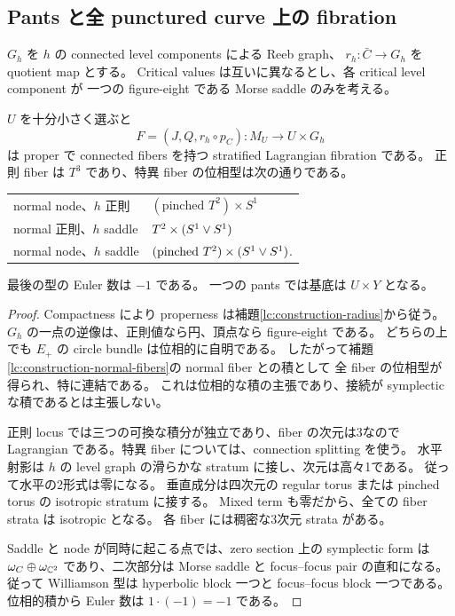 \subsection{Pants と全 punctured curve 上の fibration}

$G_h$ を $h$ の connected level components による Reeb graph、
$r_h:\bar C\to G_h$ を quotient map とする。
Critical values は互いに異なるとし、各 critical level component が
一つの figure-eight である Morse saddle のみを考える。

\begin{theorem}\label{lc:construction-block}
$U$ を十分小さく選ぶと
\[
 F=(J,Q,r_h\circ p_C):M_U\longrightarrow U\times G_h
\]
は proper で connected fibers を持つ stratified Lagrangian fibration である。
正則 fiber は $T^3$ であり、特異 fiber の位相型は次の通りである。
\begin{center}
\begin{tabular}{ll}
normal node、$h$ 正則 & $(\text{pinched }T^2)\times S^1$ \\
normal 正則、$h$ saddle & $T^2\times(S^1\vee S^1)$ \\
normal node、$h$ saddle & $(\text{pinched }T^2)\times(S^1\vee S^1)$.
\end{tabular}
\end{center}
最後の型の Euler 数は $-1$ である。
一つの pants では基底は $U\times Y$ となる。
\end{theorem}

\begin{proof}
Compactness により properness は補題\ref{lc:construction-radius}から従う。
$G_h$ の一点の逆像は、正則値なら円、頂点なら figure-eight である。
どちらの上でも $E_+$ の circle bundle は位相的に自明である。
したがって補題\ref{lc:construction-normal-fibers}の normal fiber との積として
全 fiber の位相型が得られ、特に連結である。
これは位相的な積の主張であり、接続が symplectic な積であるとは主張しない。

正則 locus では三つの可換な積分が独立であり、fiber の次元は3なので
Lagrangian である。特異 fiber については、connection splitting を使う。
水平射影は $h$ の level graph の滑らかな stratum に接し、次元は高々1である。
従って水平の2形式は零になる。
垂直成分は四次元の regular torus または pinched torus の isotropic stratum に接する。
Mixed term も零だから、全ての fiber strata は isotropic となる。
各 fiber には稠密な3次元 strata がある。

Saddle と node が同時に起こる点では、zero section 上の symplectic form は
$\omega_C\oplus\omega_{\mathbb C^2}$ であり、二次部分は Morse saddle と
focus--focus pair の直和になる。従って Williamson 型は
hyperbolic block 一つと focus--focus block 一つである。
位相的積から Euler 数は $1\cdot(-1)=-1$ である。
\end{proof}

